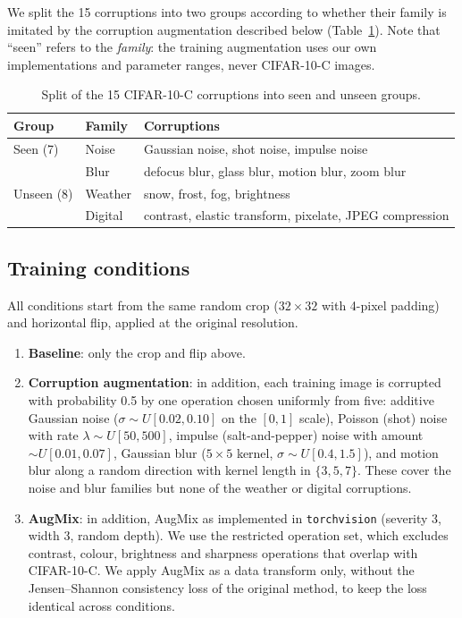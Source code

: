 \documentclass[a4paper,11pt]{article}
\begin{document}
We split the 15 corruptions into two groups according to whether their family is imitated by the corruption augmentation described below (Table~\ref{tab:split}). Note that ``seen'' refers to the \emph{family}: the training augmentation uses our own implementations and parameter ranges, never CIFAR-10-C images.

\begin{table}[t]
\centering
\caption{Split of the 15 CIFAR-10-C corruptions into seen and unseen groups.}
\label{tab:split}
\small
\begin{tabular}{lll}
\toprule
Group & Family & Corruptions \\
\midrule
Seen (7) & Noise & Gaussian noise, shot noise, impulse noise \\
 & Blur & defocus blur, glass blur, motion blur, zoom blur \\
\midrule
Unseen (8) & Weather & snow, frost, fog, brightness \\
 & Digital & contrast, elastic transform, pixelate, JPEG compression \\
\bottomrule
\end{tabular}
\end{table}

\subsection{Training conditions}
All conditions start from the same random crop ($32\times32$ with 4-pixel padding) and horizontal flip, applied at the original resolution.
\begin{enumerate}
\item \textbf{Baseline}: only the crop and flip above.
\item \textbf{Corruption augmentation}: in addition, each training image is corrupted with probability 0.5 by one operation chosen uniformly from five: additive Gaussian noise ($\sigma\sim U[0.02,0.10]$ on the $[0,1]$ scale), Poisson (shot) noise with rate $\lambda\sim U[50,500]$, impulse (salt-and-pepper) noise with amount $\sim U[0.01,0.07]$, Gaussian blur ($5\times5$ kernel, $\sigma\sim U[0.4,1.5]$), and motion blur along a random direction with kernel length in $\{3,5,7\}$. These cover the noise and blur families but none of the weather or digital corruptions.
\item \textbf{AugMix}: in addition, AugMix \cite{hendrycks2020augmix} as implemented in \texttt{torchvision} (severity 3, width 3, random depth). We use the restricted operation set, which excludes contrast, colour, brightness and sharpness operations that overlap with CIFAR-10-C. We apply AugMix as a data transform only, without the Jensen--Shannon consistency loss of the original method, to keep the loss identical across conditions.
\end{enumerate}
\end{document}
